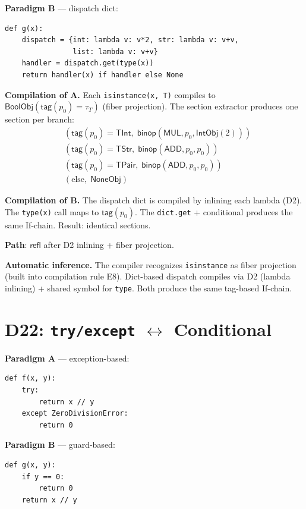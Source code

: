 \textbf{Paradigm B} --- dispatch dict:
\begin{lstlisting}
def g(x):
    dispatch = {int: lambda v: v*2, str: lambda v: v+v,
                list: lambda v: v+v}
    handler = dispatch.get(type(x))
    return handler(x) if handler else None
\end{lstlisting}

\textbf{Compilation of A.}
Each \texttt{isinstance(x, T)} compiles to
$\mathsf{BoolObj}(\mathsf{tag}(p_0) = \tau_T)$ (fiber projection).
The section extractor produces one section per branch:
\begin{align}
  &(\mathsf{tag}(p_0) = \mathsf{TInt},\; \mathsf{binop}(\mathsf{MUL}, p_0, \mathsf{IntObj}(2))) \\
  &(\mathsf{tag}(p_0) = \mathsf{TStr},\; \mathsf{binop}(\mathsf{ADD}, p_0, p_0)) \\
  &(\mathsf{tag}(p_0) = \mathsf{TPair},\; \mathsf{binop}(\mathsf{ADD}, p_0, p_0)) \\
  &(\text{else},\; \mathsf{NoneObj})
\end{align}

\textbf{Compilation of B.}
The dispatch dict is compiled by inlining each lambda (D2).  The
\texttt{type(x)} call maps to $\mathsf{tag}(p_0)$.  The
\texttt{dict.get} + conditional produces the same If-chain.
Result: identical sections.

\textbf{Path}: $\mathsf{refl}$ after D2 inlining + fiber projection.

\textbf{Automatic inference.}
The compiler recognizes \texttt{isinstance} as fiber projection
(built into compilation rule E8).  Dict-based dispatch compiles
via D2 (lambda inlining) + shared symbol for \texttt{type}.  Both
produce the same tag-based If-chain.

\section{D22: \texttt{try/except} $\leftrightarrow$ Conditional}
\label{sec:d22-effect}

\textbf{Paradigm A} --- exception-based:
\begin{lstlisting}
def f(x, y):
    try:
        return x // y
    except ZeroDivisionError:
        return 0
\end{lstlisting}

\textbf{Paradigm B} --- guard-based:
\begin{lstlisting}
def g(x, y):
    if y == 0:
        return 0
    return x // y
\end{lstlisting}

